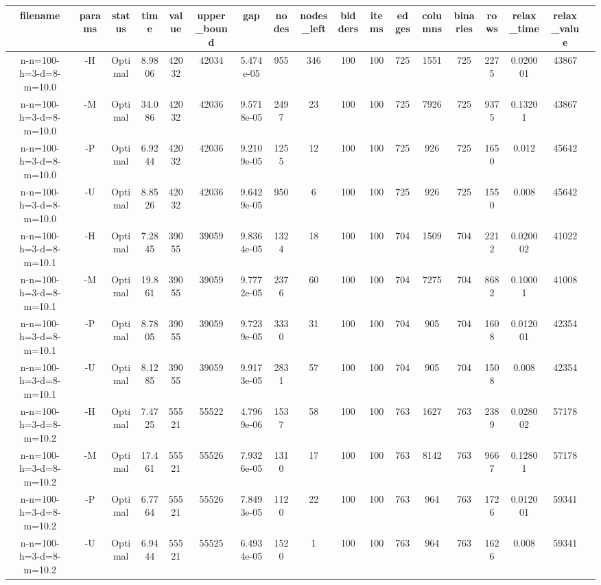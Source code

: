 \documentclass[landscape, a4paper]{article}
\begin{document}
\tiny

\begin{center}
\begin{tabular}{@{}cccccccccccccccccc@{}}
filename & params & status & time & value & upper\_bound & gap & nodes & nodes\_left & bidders & items & edges & columns & binaries & rows & relax\_time & relax\_value & \\
\hline
n-n=100-h=3-d=8-m=10.0 & -H & Optimal & 8.9806 & 42032 & 42034 & 5.474e-05 & 955 & 346 & 100 & 100 & 725 & 1551 & 725 & 2275 & 0.020001 & 43867 & \\
n-n=100-h=3-d=8-m=10.0 & -M & Optimal & 34.086 & 42032 & 42036 & 9.5718e-05 & 2497 & 23 & 100 & 100 & 725 & 7926 & 725 & 9375 & 0.13201 & 43867 & \\
n-n=100-h=3-d=8-m=10.0 & -P & Optimal & 6.9244 & 42032 & 42036 & 9.2109e-05 & 1255 & 12 & 100 & 100 & 725 & 926 & 725 & 1650 & 0.012 & 45642 & \\
n-n=100-h=3-d=8-m=10.0 & -U & Optimal & 8.8526 & 42032 & 42036 & 9.6429e-05 & 950 & 6 & 100 & 100 & 725 & 926 & 725 & 1550 & 0.008 & 45642 & \\
n-n=100-h=3-d=8-m=10.1 & -H & Optimal & 7.2845 & 39055 & 39059 & 9.8364e-05 & 1324 & 18 & 100 & 100 & 704 & 1509 & 704 & 2212 & 0.020002 & 41022 & \\
n-n=100-h=3-d=8-m=10.1 & -M & Optimal & 19.861 & 39055 & 39059 & 9.7772e-05 & 2376 & 60 & 100 & 100 & 704 & 7275 & 704 & 8682 & 0.10001 & 41008 & \\
n-n=100-h=3-d=8-m=10.1 & -P & Optimal & 8.7805 & 39055 & 39059 & 9.7239e-05 & 3330 & 31 & 100 & 100 & 704 & 905 & 704 & 1608 & 0.012001 & 42354 & \\
n-n=100-h=3-d=8-m=10.1 & -U & Optimal & 8.1285 & 39055 & 39059 & 9.9173e-05 & 2831 & 57 & 100 & 100 & 704 & 905 & 704 & 1508 & 0.008 & 42354 & \\
n-n=100-h=3-d=8-m=10.2 & -H & Optimal & 7.4725 & 55521 & 55522 & 4.7969e-06 & 1537 & 58 & 100 & 100 & 763 & 1627 & 763 & 2389 & 0.028002 & 57178 & \\
n-n=100-h=3-d=8-m=10.2 & -M & Optimal & 17.461 & 55521 & 55526 & 7.9326e-05 & 1310 & 17 & 100 & 100 & 763 & 8142 & 763 & 9667 & 0.12801 & 57178 & \\
n-n=100-h=3-d=8-m=10.2 & -P & Optimal & 6.7764 & 55521 & 55526 & 7.8493e-05 & 1120 & 22 & 100 & 100 & 763 & 964 & 763 & 1726 & 0.012001 & 59341 & \\
n-n=100-h=3-d=8-m=10.2 & -U & Optimal & 6.9444 & 55521 & 55525 & 6.4934e-05 & 1520 & 1 & 100 & 100 & 763 & 964 & 763 & 1626 & 0.008 & 59341 & \\

\end{tabular}
\end{center}
\end{document}
